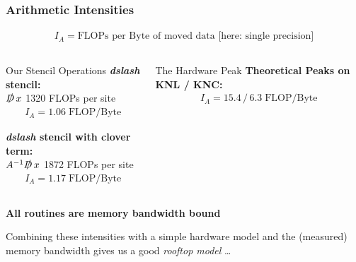 \documentclass{beamer}
\begin{document}
  \begin{frame}
    \frametitle{Arithmetic Intensities}
    \vspace{-5mm}
    \footnotesize

    \begin{align*}
      I_A = \textrm{FLOPs per Byte of moved data [here: single precision]}
    \end{align*}

    \begin{columns}[t]
    \begin{column}{0.49\linewidth}
      \begin{block}{Our Stencil Operations}
      \textbf{\textit{dslash} stencil:} \\ $\slashed D \,x$ \hfill 1320 FLOPs per site
      \begin{align*}
        I_A = 1.06 \; \textrm{FLOP/Byte}
      \end{align*}

      \textbf{\textit{dslash} stencil with clover term:} \\ $A^{-1}  \slashed D \, x$ \hfill 1872 FLOPs per site
      \begin{align*}
        I_A = 1.17 \; \textrm{FLOP/Byte}
      \end{align*}
      \end{block}
    \end{column}

    \hfill
    \begin{column}{0.49\linewidth}
      \begin{block}{The Hardware Peak}
      \textbf{Theoretical Peaks on KNL / KNC:}
      \begin{align*}
        I_A = 15.4 \, / \, 6.3 \; \textrm{FLOP/Byte}
      \end{align*}
      \vfill
      \end{block}
    \end{column}
    \end{columns}

    \vfill
    {
      \large
      \centering \textbf{All routines are memory bandwidth bound}\\
    }

    \vfill
    Combining these intensities with a simple hardware model and the (measured) memory bandwidth
    gives us a good \textit{rooftop model} \dots

  \end{frame}

\end{document}
